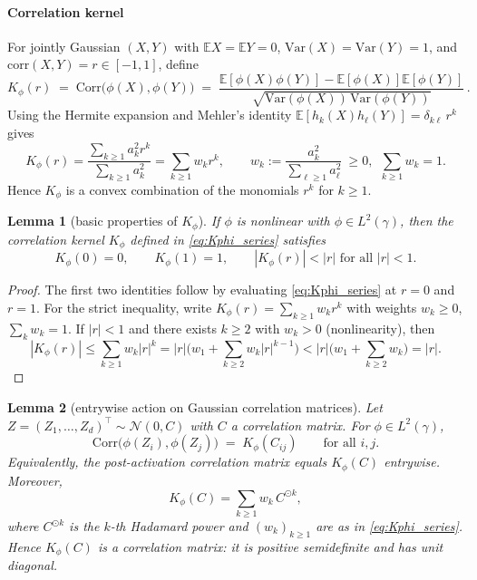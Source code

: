 \documentclass{article}
\newtheorem{lemma}{Lemma}[section]
\numberwithin{figure}{section}
\begin{document}
\paragraph{Correlation kernel}
For jointly Gaussian $(X,Y)$ with $\mathbb{E}X=\mathbb{E}Y=0$, $\mathrm{Var}(X)=\mathrm{Var}(Y)=1$, and $\mathrm{corr}(X,Y)=r\in[-1,1]$, define
\[
K_\phi(r) \;=\; \mathrm{Corr}\big(\phi(X),\phi(Y)\big) \;=\; 
\frac{\mathbb{E}[\phi(X)\phi(Y)]-\mathbb{E}[\phi(X)]\mathbb{E}[\phi(Y)]}{\sqrt{\mathrm{Var}(\phi(X))\,\mathrm{Var}(\phi(Y))}} \, .
\]
Using the Hermite expansion and Mehler's identity $\mathbb{E}[h_k(X)h_\ell(Y)]=\delta_{k\ell}\, r^k$ gives
\begin{equation}
\label{eq:Kphi_series}
K_\phi(r)
=\frac{\sum_{k\ge 1} a_k^2 r^k}{\sum_{k\ge 1} a_k^2}
=\sum_{k\ge 1} w_k r^k,
\qquad
w_k:=\frac{a_k^2}{\sum_{\ell\ge 1} a_\ell^2}\ \ge 0,\ \ \sum_{k\ge 1} w_k=1 .
\end{equation}
Hence $K_\phi$ is a convex combination of the monomials $r^k$ for $k\ge 1$.

\begin{lemma}[basic properties of $K_\phi$]
\label{lem:K_basic}
If $\phi$ is nonlinear with $\phi\in L^2(\gamma)$, then the correlation kernel $K_\phi$ defined in \eqref{eq:Kphi_series} satisfies
\[
K_\phi(0)=0, \qquad K_\phi(1)=1, \qquad |K_\phi(r)|<|r| \text{ for all } |r|<1 .
\]
\end{lemma}

\begin{proof}
The first two identities follow by evaluating \eqref{eq:Kphi_series} at $r=0$ and $r=1$. For the strict inequality, write $K_\phi(r)=\sum_{k\ge 1} w_k r^k$ with weights $w_k\ge 0$, $\sum_k w_k=1$. If $|r|<1$ and there exists $k\ge 2$ with $w_k>0$ (nonlinearity), then
\[
|K_\phi(r)| \le \sum_{k\ge 1} w_k |r|^k = |r|\Big(w_1 + \sum_{k\ge 2} w_k |r|^{k-1}\Big)
< |r|\Big(w_1 + \sum_{k\ge 2} w_k\Big) = |r| .
\]
\end{proof}

\begin{lemma}[entrywise action on Gaussian correlation matrices]
\label{lem:entrywise}
Let $Z=(Z_1,\dots,Z_d)^\top\sim \mathcal{N}(0,C)$ with $C$ a correlation matrix. For $\phi\in L^2(\gamma)$,
\[
\mathrm{Corr}\big(\phi(Z_i),\phi(Z_j)\big) \;=\; K_\phi(C_{ij}) \qquad \text{for all } i,j .
\]
Equivalently, the post-activation correlation matrix equals $K_\phi(C)$ entrywise. Moreover,
\[
K_\phi(C)=\sum_{k\ge 1} w_k\, C^{\odot k},
\]
where $C^{\odot k}$ is the $k$-th Hadamard power and $(w_k)_{k\ge 1}$ are as in \eqref{eq:Kphi_series}. Hence $K_\phi(C)$ is a correlation matrix: it is positive semidefinite and has unit diagonal.
\end{lemma}
\end{document}
